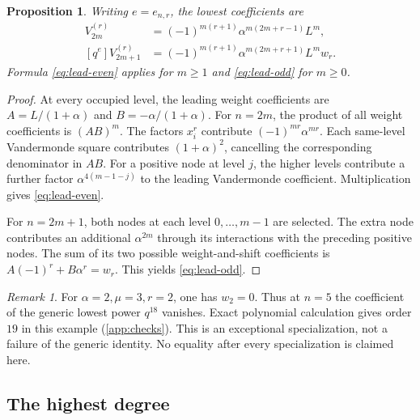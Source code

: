 \documentclass[11pt]{article}
\numberwithin{equation}{section}
\newtheorem{proposition}[proposition]{Proposition}
\theoremstyle{definition}
\theoremstyle{remark}
\newtheorem{remark}[remark]{Remark}
\begin{document}
\begin{proposition}\label{prop:leading}
Writing $e=e_{n,r}$, the lowest coefficients are
\begin{align}
 [q^e]V_{2m}^{(r)}
 &=(-1)^{m(r+1)}\alpha^{m(2m+r-1)}L^m,\label{eq:lead-even}\\
 [q^e]V_{2m+1}^{(r)}
 &=(-1)^{m(r+1)}\alpha^{m(2m+r+1)}L^m w_r.\label{eq:lead-odd}
\end{align}
Formula \eqref{eq:lead-even} applies for $m\ge1$ and
\eqref{eq:lead-odd} for $m\ge0$.
\end{proposition}
\begin{proof}
At every occupied level, the leading weight coefficients are
$A=L/(1+\alpha)$ and $B=-\alpha/(1+\alpha)$.
For $n=2m$, the product of all weight coefficients is $(AB)^m$.
The factors $x_i^r$ contribute $(-1)^{mr}\alpha^{mr}$.
Each same-level Vandermonde square contributes $(1+\alpha)^2$,
cancelling the corresponding denominator in $AB$.
For a positive node at level $j$, the higher levels contribute a further
factor $\alpha^{4(m-1-j)}$ to the leading Vandermonde coefficient.
Multiplication gives \eqref{eq:lead-even}.

For $n=2m+1$, both nodes at each level $0,\ldots,m-1$ are selected.
The extra node contributes an additional $\alpha^{2m}$ through its
interactions with the preceding positive nodes. The sum of its two possible
weight-and-shift coefficients is
$A(-1)^r+B\alpha^r=w_r$.
This yields \eqref{eq:lead-odd}.
\end{proof}

\begin{remark}\label{rem:exception}
For $\alpha=2,\mu=3,r=2$, one has $w_2=0$. Thus at $n=5$ the
coefficient of the generic lowest power $q^{18}$ vanishes.
Exact polynomial calculation gives order $19$ in this example
(\cref{app:checks}). This is an exceptional specialization, not a
failure of the generic identity. No equality after every specialization is
claimed here.
\end{remark}

\subsection{The highest degree}
\end{document}
